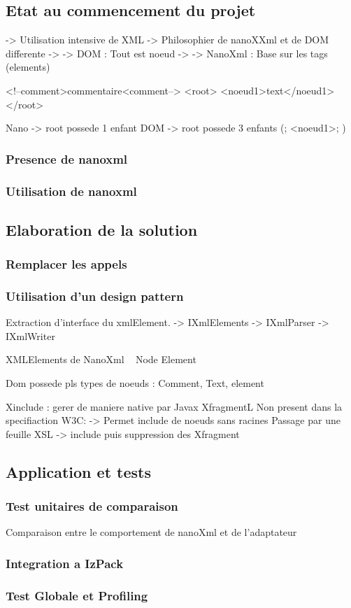 \subsection{Etat au commencement du projet}
-> Utilisation intensive de XML
-> Philosophier de nanoXXml et de DOM differente
-> -> DOM : Tout est noeud
-> -> NanoXml : Base sur les tags (elements)

<!--comment>commentaire<comment-->
<root>
	<noeud1>text</noeud1>
</root>

Nano -> root possede 1 enfant
DOM -> root possede 3 enfants (\n; <noeud1>; \n)
\subsubsection{Presence de nanoxml}
\subsubsection{Utilisation de nanoxml}


\subsection{Elaboration de la solution}
\subsubsection{Remplacer les appels}
\subsubsection{Utilisation d'un design pattern}
Extraction d'interface du xmlElement.
-> IXmlElements
-> IXmlParser
-> IXmlWriter

XMLElements de NanoXml ~ Node Element

Dom possede pls types de noeuds : Comment, Text, element

Xinclude : gerer de maniere native par Javax
XfragmentL Non present dans la specifiaction W3C:
-> Permet include de noeuds sans racines
Passage par une feuille XSL
-> include puis suppression des Xfragment
\subsection{Application et tests}
\subsubsection{Test unitaires de comparaison}
Comparaison entre le comportement de nanoXml et de l'adaptateur
\subsubsection{Integration a IzPack}
\subsubsection{Test Globale et Profiling}

